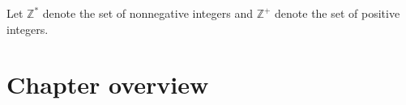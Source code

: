 \begin{definition} Let $\mathbb{Z}^*$ denote the set of nonnegative integers
and $\mathbb{Z}^+$ denote the set of positive integers.\end{definition}

\section{Chapter overview}

\begin{description}[\setleftmargin{70pt}\setlabelstyle{\bf}]

\item [Chapter 2]

\item [Chapter 3]

\item [Chapter 4]

\item [Chapter 5]

\end{description}
